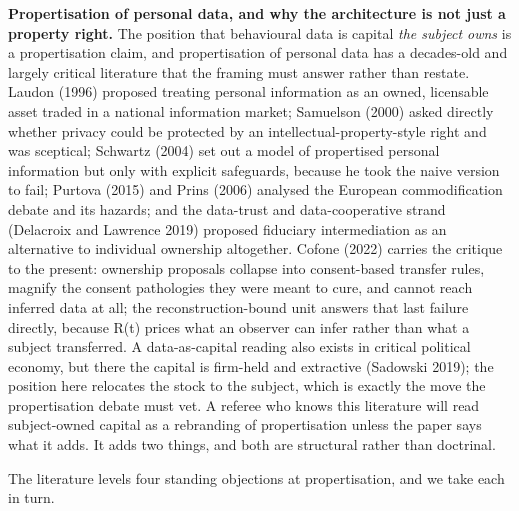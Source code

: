 \documentclass[
  11pt,
]{article}
\begin{document}
\textbf{Propertisation of personal data, and why the architecture is not
just a property right.} The position that behavioural data is capital
\emph{the subject owns} is a propertisation claim, and propertisation of
personal data has a decades-old and largely critical literature that the
framing must answer rather than restate. Laudon (1996) proposed treating
personal information as an owned, licensable asset traded in a national
information market; Samuelson (2000) asked directly whether privacy
could be protected by an intellectual-property-style right and was
sceptical; Schwartz (2004) set out a model of propertised personal
information but only with explicit safeguards, because he took the naive
version to fail; Purtova (2015) and Prins (2006) analysed the European
commodification debate and its hazards; and the data-trust and
data-cooperative strand (Delacroix and Lawrence 2019) proposed fiduciary
intermediation as an alternative to individual ownership altogether.
Cofone (2022) carries the critique to the present: ownership proposals
collapse into consent-based transfer rules, magnify the consent
pathologies they were meant to cure, and cannot reach inferred data at
all; the reconstruction-bound unit answers that last failure directly,
because R(t) prices what an observer can infer rather than what a
subject transferred. A data-as-capital reading also exists in critical
political economy, but there the capital is firm-held and extractive
(Sadowski 2019); the position here relocates the stock to the subject,
which is exactly the move the propertisation debate must vet. A referee
who knows this literature will read subject-owned capital as a
rebranding of propertisation unless the paper says what it adds. It adds
two things, and both are structural rather than doctrinal.

The literature levels four standing objections at propertisation, and we
take each in turn.
\end{document}

